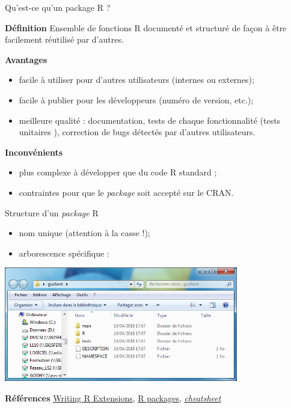 \documentclass[12pt,handout,ignorenonframetext,]{beamer}
\providecommand{\tightlist}{%
  \setlength{\itemsep}{0pt}\setlength{\parskip}{0pt}}
\newcommand{\intertitre}[1]{\textbf{\textcolor{redInsee}{#1}}}
\begin{document}
\begin{frame}{Qu'est-ce qu'un package R ?}

\intertitre{Définition} Ensemble de fonctions R documenté et structuré
de façon à être facilement réutilisé par d'autres.

\pause \bigskip \intertitre{Avantages}

\begin{itemize}
\tightlist
\item
  \vspace{-0.2cm} facile à utiliser pour d'autres utilisateurs (internes
  ou externes);
\item
  facile à publier pour les développeurs (numéro de version, etc.);
\item
  meilleure qualité : documentation, tests de chaque fonctionnalité
  (\og tests unitaires \fg{}), correction de bugs détectés par d'autres
  utilisateurs.
\end{itemize}

\pause \bigskip \intertitre{Inconvénients}

\begin{itemize}
\tightlist
\item
  \vspace{-0.2cm} plus complexe à développer que du code R standard ;
\item
  contraintes pour que le \emph{package} soit accepté sur le CRAN.
\end{itemize}

\end{frame}

\begin{frame}{Structure d'un \emph{package} R}

\begin{itemize}
\tightlist
\item
  nom unique (attention à la casse !);
\item
  \pause arborescence spécifique :
\end{itemize}

\pause \vspace{-0.3cm}

\begin{center}
\includegraphics[height=5cm]{root_gustave.png}
\end{center}

\pause \intertitre{Références}
\href{https://cran.r-project.org/doc/manuals/r-release/R-exts.html}{\underline{Writing R Extensions}},
\href{http://r-pkgs.had.co.nz/}{\underline{R packages}},
\href{https://www.rstudio.com/wp-content/uploads/2015/03/devtools-cheatsheet.pdf}{\underline{\textit{cheatsheet}}}

\end{frame}
\end{document}
